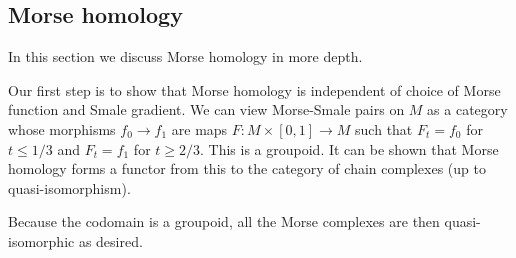 \subsection{Morse homology}

In this section we discuss Morse homology in more depth.

Our first step is to show that Morse homology is independent of choice of Morse function and Smale gradient.
We can view Morse-Smale pairs on $M$ as a category whose morphisms $f_0\to f_1$ are maps
$F\colon M\times[0,1]\to M$ such that $F_t=f_0$ for $t\leq1/3$ and $F_t=f_1$ for $t\geq2/3$.
This is a groupoid.
It can be shown that Morse homology forms a functor from this to the category of chain complexes
(up to quasi-isomorphism).

Because the codomain is a groupoid, all the Morse complexes are then quasi-isomorphic as desired.


